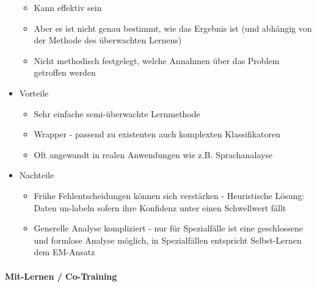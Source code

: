 \documentclass[paper=a4, fontsize=11pt]{scrartcl} %
\numberwithin{equation}{section} %
\numberwithin{figure}{section} %
\numberwithin{table}{section} %
\begin{document}
\begin{itemize}
\begin{itemize}
\item Kann effektiv sein
\item Aber es ist nicht genau bestimmt, wie das Ergebnis ist (und abhängig von der Methode des überwachten Lernens)
\item Nicht methodisch festgelegt, welche Annahmen über das Problem getroffen werden
\end{itemize}
\item Vorteile
\begin{itemize}
\item Sehr einfache semi-überwachte Lernmethode
\item Wrapper - passend zu existenten auch komplexten Klassifikatoren
\item Oft angewandt in realen Anwendungen wie z.B. Sprachanalayse
\end{itemize}
\item Nachteile
\begin{itemize}
\item Frühe Fehlentscheidungen können sich verstärken - Heuristische Lösung: Daten un-labeln sofern ihre Konfidenz unter einen Schwellwert fällt
\item Generelle Analyse kompliziert - nur für Spezialfälle ist eine geschlossene und formlose Analyse möglich, in Spezialfällen entspricht Selbst-Lernen dem EM-Ansatz
\end{itemize}
\end{itemize}

\paragraph{Mit-Lernen / Co-Training}
\end{document}
